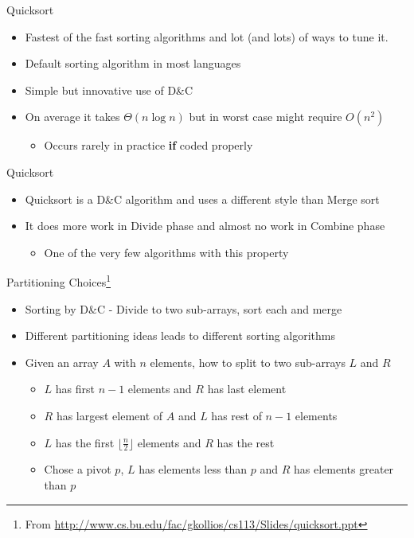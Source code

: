 \documentclass{beamer}
\begin{document}
\begin{frame}{Quicksort}
\begin{itemize}
\item Fastest of the fast sorting algorithms and lot (and lots) of ways to tune it.
\item Default sorting algorithm in most languages
\item Simple but innovative use of D\&C
\item On average it takes $\Theta(n \log n)$ but in worst case might require $O(n^2)$
\begin{itemize}
    \item Occurs rarely in practice {\bf if} coded properly
\end{itemize}
\end{itemize}
\end{frame}



\begin{frame}{Quicksort}
\begin{itemize}
\item Quicksort is a D\&C algorithm and uses a different style than Merge sort
\item It does more work in Divide phase and almost no work in Combine phase
\begin{itemize}
\item   One of the very few algorithms with this property
\end{itemize}
\end{itemize}
\end{frame}

\begin{frame}{Partitioning Choices\footnote{From \url{http://www.cs.bu.edu/fac/gkollios/cs113/Slides/quicksort.ppt}}}
\begin{itemize}
\item Sorting by D\&C - Divide to two sub-arrays, sort each and merge
\item Different partitioning ideas leads to different sorting algorithms
\item Given an array $A$ with $n$ elements, how to split to two sub-arrays $L$ and $R$ 
\begin{itemize}
    \item $L$ has first $n-1$ elements and $R$ has last element 
    \item $R$ has largest element of $A$ and $L$ has rest of $n-1$ elements
    \item $L$ has the first $\lfloor \frac{n}{2} \rfloor$ elements and $R$ has the rest
    \item Chose a pivot $p$, $L$ has elements less than $p$ and $R$ has elements greater than $p$
\end{itemize}
\end{itemize}
\end{frame}
\end{document}
